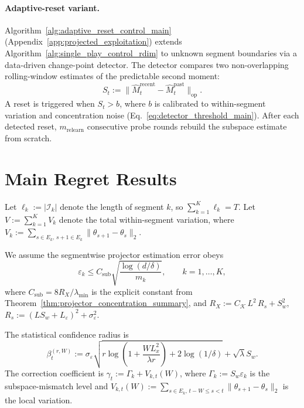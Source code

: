 \documentclass{article}
\newcommand{\op}{\mathrm{op}}
\newcommand{\cI}{\mathcal{I}}
\begin{document}
\paragraph{Adaptive-reset variant.}
Algorithm~\ref{alg:adaptive_reset_control_main} (Appendix~\ref{app:projected_exploitation}) extends Algorithm~\ref{alg:single_play_control_rdim} to unknown segment boundaries via a data-driven change-point detector.
The detector compares two non-overlapping rolling-window estimates of the predictable second moment:
\begin{equation}
S_t := \|\widehat M_t^{\mathrm{recent}} - \widehat M_t^{\mathrm{past}}\|_{\op}.
\label{eq:detector_stat}
\end{equation}
A reset is triggered when $S_t > b$, where $b$ is calibrated to within-segment variation and concentration noise (Eq.~\eqref{eq:detector_threshold_main}).
After each detected reset, $m_{\mathrm{relearn}}$ consecutive probe rounds rebuild the subspace estimate from scratch.

\section{Main Regret Results}
\label{sec:theory}

Let $\ell_k := |\cI_k|$ denote the length of segment $k$, so $\sum_{k=1}^K \ell_k = T$.
Let $V := \sum_{k=1}^K V_k$ denote the total within-segment variation, where $V_k := \sum_{s\in E_k,\,s+1\in E_k}\|\theta_{s+1}-\theta_s\|_2$.

We assume the segmentwise projector estimation error obeys
\begin{equation}
\varepsilon_k \le C_{\mathrm{sub}} \sqrt{\frac{\log(d/\delta)}{m_k}},
\qquad k=1,\dots,K,
\label{eq:eps_k_rate}
\end{equation}
where $C_{\mathrm{sub}} = 8R_X/\lambda_{\min}$ is the explicit constant from Theorem~\ref{thm:projector_concentration_summary}, and $R_X := C_{\mathcal K}\,L^2\,R_s + S_w^2$, $R_s := (LS_w + L_\varepsilon)^2 + \sigma_\varepsilon^2$.

The statistical confidence radius is
\begin{equation}
\beta_t^{(r,W)} := \sigma_\varepsilon
\sqrt{r \log\!\left(1+\frac{W L_x^2}{\lambda r}\right) + 2\log(1/\delta)} + \sqrt{\lambda}S_w.
\label{eq:beta_rW}
\end{equation}
The correction coefficient is $\gamma_t := \Gamma_k + V_{k,t}(W)$, where $\Gamma_k := S_w \varepsilon_k$ is the subspace-mismatch level and $V_{k,t}(W) := \sum_{s\in E_k,\, t-W \le s < t}\|\theta_{s+1}-\theta_s\|_2$ is the local variation.
\end{document}
